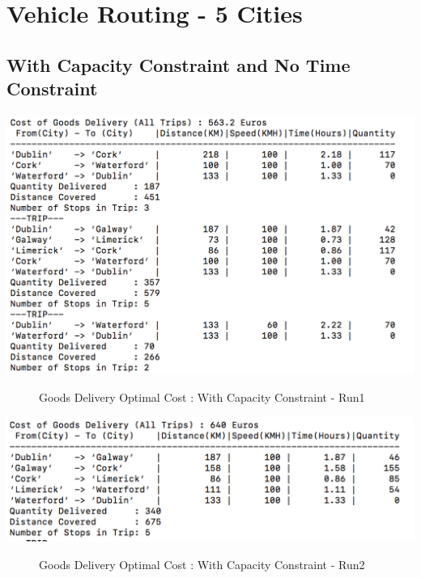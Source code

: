 \documentclass[a4paper&11pt]{article}
\begin{document}
\section*{ Vehicle Routing - 5 Cities}
\subsection*{With Capacity Constraint and No Time Constraint}


\begin{center}
\includegraphics[scale=0.8]{fig1.png}
\begin{figure}[H]
\caption{Goods Delivery Optimal Cost :  With Capacity Constraint - Run1}
\label{fig:fig1}
\end{figure}
\end{center}


\begin{center}
\includegraphics[scale=0.8]{fig2.png}
\begin{figure}[H]
\caption{Goods Delivery Optimal Cost :  With Capacity Constraint - Run2}
\label{fig:fig2}
\end{figure}
\end{center}
\end{document}
